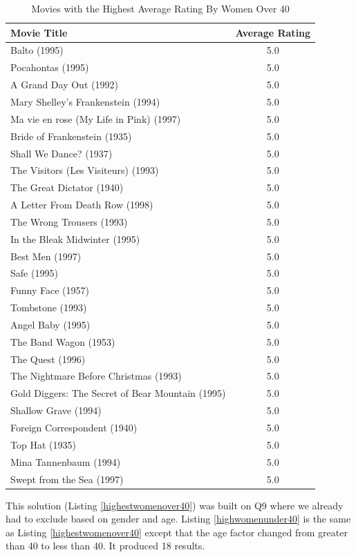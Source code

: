 \documentclass{article}
\begin{document}
\begin{table}[!h]
\centering
\begin{tabular}{l c}
Movie Title & Average Rating \\
\hline
Balto (1995) & 5.0 \\
Pocahontas (1995) & 5.0 \\
A Grand Day Out (1992) & 5.0 \\
Mary Shelley's Frankenstein (1994) & 5.0 \\
Ma vie en rose (My Life in Pink) (1997) & 5.0 \\
Bride of Frankenstein (1935) & 5.0 \\
Shall We Dance? (1937) & 5.0 \\
The Visitors (Les Visiteurs) (1993) & 5.0 \\
The Great Dictator (1940) & 5.0 \\
A Letter From Death Row (1998) & 5.0 \\
The Wrong Trousers (1993) & 5.0 \\
In the Bleak Midwinter (1995) & 5.0 \\
Best Men (1997) & 5.0 \\
Safe (1995) & 5.0 \\
Funny Face (1957) & 5.0 \\
Tombstone (1993) & 5.0 \\
Angel Baby (1995) & 5.0 \\
The Band Wagon (1953) & 5.0 \\
The Quest (1996) & 5.0 \\
The Nightmare Before Christmas (1993) & 5.0 \\
Gold Diggers: The Secret of Bear Mountain (1995) & 5.0 \\
Shallow Grave (1994) & 5.0 \\
Foreign Correspondent (1940) & 5.0 \\
Top Hat (1935) & 5.0 \\
Mina Tannenbaum (1994) & 5.0 \\
Swept from the Sea (1997) & 5.0 \\
\hline
\end{tabular}
\caption{Movies with the Highest Average Rating By Women Over 40}
\end{table}

This solution (Listing \ref{highestwomenover40}) was built on Q9 where we already had to exclude based on gender and age. Listing \ref{highwomenunder40} is the same as Listing \ref{highestwomenover40} except that the age factor changed from greater than 40 to less than 40. It produced 18 results.
\end{document}
